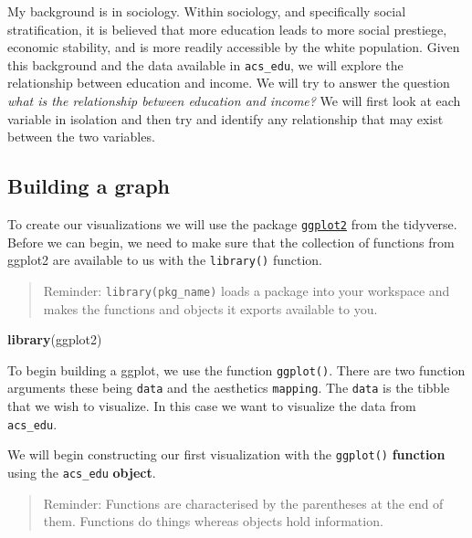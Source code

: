 \documentclass[
]{book}
\newenvironment{Shaded}{\begin{snugshade}}{\end{snugshade}}
\newcommand{\KeywordTok}[1]{\textcolor[rgb]{0.13,0.29,0.53}{\textbf{#1}}}
\newcommand{\NormalTok}[1]{#1}
\begin{document}
My background is in sociology. Within sociology, and specifically social stratification, it is believed that more education leads to more social prestiege, economic stability, and is more readily accessible by the white population. Given this background and the data available in \texttt{acs\_edu}, we will explore the relationship between education and income. We will try to answer the question \emph{what is the relationship between education and income?} We will first look at each variable in isolation and then try and identify any relationship that may exist between the two variables.

\hypertarget{building-a-graph}{%
\subsection{Building a graph}\label{building-a-graph}}

To create our visualizations we will use the package \href{https://ggplot2.tidyverse.org/}{\texttt{ggplot2}} from the tidyverse. Before we can begin, we need to make sure that the collection of functions from ggplot2 are available to us with the \texttt{library()} function.

\begin{quote}
Reminder: \texttt{library(pkg\_name)} loads a package into your workspace and makes the functions and objects it exports available to you.
\end{quote}

\begin{Shaded}
\begin{Highlighting}[]
\KeywordTok{library}\NormalTok{(ggplot2)}
\end{Highlighting}
\end{Shaded}

To begin building a ggplot, we use the function \texttt{ggplot()}. There are two function arguments these being \texttt{data} and the aesthetics \texttt{mapping}. The \texttt{data} is the tibble that we wish to visualize. In this case we want to visualize the data from \texttt{acs\_edu}.

We will begin constructing our first visualization with the \texttt{ggplot()} \textbf{function} using the \texttt{acs\_edu} \textbf{object}.

\begin{quote}
Reminder: Functions are characterised by the parentheses at the end of them. Functions do things whereas objects hold information.
\end{quote}
\end{document}
